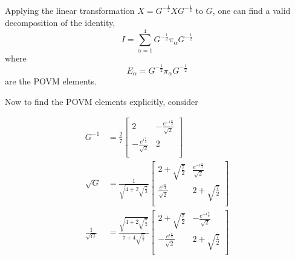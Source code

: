 Applying the linear transformation $X = G^{-\frac{1}{2}}X G^{-\frac{1}{2}}$ to $G$, one can find a valid decomposition of the identity,
$$
I = \sum_{\alpha=1}^{4} G^{-\frac{1}{2}} \pi_{\alpha} G^{-\frac{1}{2}}
$$
where 
$$
E_{\alpha} = G^{-\frac{1}{2}} \pi_{\alpha} G^{-\frac{1}{2}}
$$ 
are the POVM elements.

Now to find the POVM elements explicitly, consider

{\fontsize{7.9pt}{10pt}\selectfont
\begin{align*}
G^{-1} & = \frac{2}{7}
\begin{bmatrix}
2 & -\frac{e^{-i\frac{\pi}{4}}}{\sqrt{2}} \\ 
-\frac{e^{i\frac{\pi}{4}}}{\sqrt{2}} & 2\\ 
\end{bmatrix}\\
\sqrt{G} & = \frac{1}{\sqrt{4+2\sqrt{\frac{7}{2}}}}
\begin{bmatrix}
2+\sqrt{\frac{7}{2}} & \frac{e^{-i\frac{\pi}{4}}}{\sqrt{2}}\\ 
\frac{e^{i\frac{\pi}{4}}}{\sqrt{2}} & 2+\sqrt{\frac{7}{2}}\\ 
\end{bmatrix}\\
\frac{1}{\sqrt{G}} & = \frac{\sqrt{4+2\sqrt{\frac{7}{2}}}}{7+4\sqrt{\frac{7}{2}}}
\begin{bmatrix}
2+\sqrt{\frac{7}{2}} & -\frac{e^{-i\frac{\pi}{4}}}{\sqrt{2}}\\ 
-\frac{e^{i\frac{\pi}{4}}}{\sqrt{2}} & 2+\sqrt{\frac{7}{2}}\\ 
\end{bmatrix}
\end{align*}}

